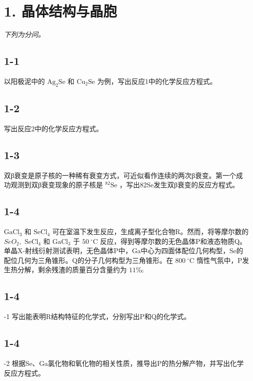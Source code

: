 \section*{1. 晶体结构与晶胞}
\textit{下列为分问。}

\subsection*{1-1}
以阳极泥中的 $\mathrm { A g _ { 2 } S e }$ 和 $\mathrm { C u _ { 2 } S e }$ 为例，写出反应1中的化学反应⽅程式。

\subsection*{1-2}
写出反应2中的化学反应⽅程式。

\subsection*{1-3}
双β衰变是原⼦核的⼀种稀有衰变⽅式，可近似看作连续的两次β衰变。第⼀个成功观测到双β衰变现象的原⼦核是 $^ { 8 2 } \mathrm { S e }$ ，写出82Se发⽣双β衰变的反应⽅程式。

\subsection*{1-4}
$\mathrm { G a C l _ { 3 } }$ 和 $\mathrm { S e C l _ { 4 } }$ 可在室温下发⽣反应，⽣成离⼦型化合物R。然⽽，将等摩尔数的 $S e O _ { 2 } ,$ $\mathrm { S e C l _ { 4 } }$ 和 $\mathrm { G a C l _ { 3 } }$ 于 $5 0 ~ ^ { \circ } \mathrm { C }$ 反应，得到等摩尔数的⽆⾊晶体P和液态物质Q。单晶X-射线衍射测试表明，⽆⾊晶体P中，Ga中⼼为四⾯体配位⼏何构型，Se的配位⼏何为三⻆锥形。Q的分⼦⼏何构型为三⻆锥形。在 $8 0 0 ~ ^ { \circ } \mathrm { C }$ 惰性⽓氛中，P发⽣热分解，剩余残渣的质量百分含量约为 $1 1 \text{‰}$

\subsection*{1-4}
-1 写出能表明R结构特征的化学式，分别写出P和Q的化学式。

\subsection*{1-4}
-2 根据Se、Ga氯化物和氧化物的相关性质，推导出P的热分解产物，并写出化学反应⽅程式。
